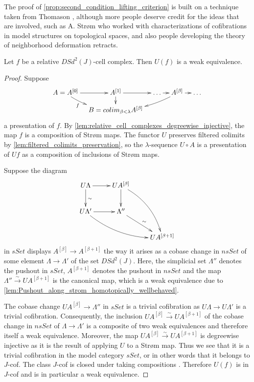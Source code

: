 The proof of \cref{prop:second_condition_lifting_criterion} is built on a technique taken from Thomason \cite{Th80}, although more people deserve credit for the ideas that are involved, such as A. Str\o m who worked with characterizations of cofibrations in model structures on topological spaces, and also people developing the theory of neighborhood deformation retracts.
\begin{proposition}\label{prop:second_condition_lifting_criterion}
Let $f$ be a relative $DSd^2(J)$-cell complex. Then $U(f)$ is a weak equivalence.
\end{proposition}
\begin{proof}
Suppose
\begin{equation}
\label{eq:first_diagram_proof_prop_second_condition_lifting_criterion}
\begin{gathered}
\xymatrix@=0.9em{
A=A^{[0]} \ar@/_/[dr]_(.3)f \ar[r] & A^{[1]} \ar[d] \ar[r] & \dots \ar[r] & A^{[\beta ]}\ar@/^/[lld] \ar[r] & \dots \\
& B=colim_{\beta <\lambda }A^{[\beta ]}
}
\end{gathered}
\end{equation}
a presentation of $f$. By \cref{lem:relative_cell_complexes_degreewise_injective}, the map $f$ is a composition of Str\o m maps. The functor $U$ preserves filtered colimits by \cref{lem:filtered_colimits_preservation}, so the $\lambda$-sequence $U\circ A$ is a presentation of $Uf$ as a composition of inclusions of Str\o m maps.

Suppose the diagram
\begin{displaymath}
\xymatrix{
U\Lambda \ar[d]^\sim \ar[r] & UA^{[\beta ]}\ar[d] \ar@/^1pc/[ddr] \\
U\Lambda ' \ar[r] \ar@/_1pc/[drr] & \Lambda '' \ar[dr]^\sim \\
&& UA^{[\beta +1]}
}
\end{displaymath}
in $sSet$ displays $A^{[\beta ]}\to A^{[\beta +1]}$ the way it arises as a cobase change in $nsSet$ of some element $\Lambda \to \Lambda '$ of the set $DSd^2(J)$. Here, the simplicial set $\Lambda ''$ denotes the pushout in $sSet$, $A^{[\beta +1]}$ denotes the pushout in $nsSet$ and the map $\Lambda ''\xrightarrow{\sim } UA^{[\beta +1]}$ is the canonical map, which is a weak equivalence due to \cref{lem:Pushout_along_strom_homotopically_wellbehaved}.

The cobase change $UA^{[\beta ]}\to \Lambda ''$ in $sSet$ is a trivial cofibration as $U\Lambda \to U\Lambda '$ is a trivial cofibration. Consequently, the inclusion $UA^{[\beta ]}\xrightarrow{\sim } UA^{[\beta +1]}$ of the cobase change in $nsSet$ of $\Lambda \to \Lambda '$ is a composite of two weak equivalences and therefore itself a weak equivalence. Moreover, the map $UA^{[\beta ]}\xrightarrow{\sim } UA^{[\beta +1]}$ is degreewise injective as it is the result of applying $U$ to a Str\o m map. Thus we see that it is a trivial cofibration in the model category $sSet$, or in other words that it belongs to $J$-cof. The class $J$-cof is closed under taking compositions \cite[Lem.~10.3.1]{Hi03}. Therefore $U(f)$ is in $J$-cof and is in particular a weak equivalence.
\end{proof}
